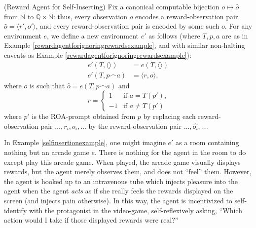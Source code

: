 \documentclass[runningheads]{llncs}
\begin{document}
\begin{example}
\label{selfinsertionexample}
    (Reward Agent for Self-Inserting)
    Fix a canonical computable bijection
    $o\mapsto \hat o$
    from $\mathbb N$ to $\mathbb Q\times \mathbb N$:
    thus, every observation $o$ encodes a reward-observation pair
    $\hat o = \langle r',o'\rangle$, and every reward-observation pair
    is encoded by some such $o$.
    For any environment $e$, we define
    a new environment $e'$ as follows
    (where $T,p,a$ are as in Example \ref{rewardagentforignoringrewardsexample},
    and with similar non-halting caveats
    as Example \ref{rewardagentforignoringrewardsexample}):
    \begin{align*}
        e'(T,\langle\rangle) &= e(T,\langle\rangle)\\
        e'(T,p\frown a) &= \langle r,o\rangle,
    \end{align*}
    where $o$ is such that $\hat o = e(T,p\frown a)$ and
    \[
        r =
        \begin{cases}
            1 & \mbox{if $a=T(p')$,}\\
            -1 & \mbox{if $a\not=T(p')$}
        \end{cases}
    \]
    where
    $p'$ is the ROA-prompt obtained from $p$
    by replacing each reward-observation pair
    $\ldots,r_i,o_i,\ldots$ by the reward-observation
    pair $\ldots,\widehat{o_i},\ldots$.
\end{example}

In Example \ref{selfinsertionexample}, one might imagine $e'$ as a room containing nothing
but an arcade game $e$. There is nothing for the agent in the room to do
except play this arcade game.
When played, the arcade game
visually displays rewards, but the agent merely observes them, and does not
``feel'' them. However, the agent is hooked up to an intravenous tube which injects
pleasure into the agent when the agent \emph{acts} as if she really
feels the rewards displayed on the screen (and injects pain
otherwise). In this way, the agent is incentivized
to self-identify with the protagonist in the video-game, self-reflexively asking,
``Which action would I take if those displayed rewards were real?''
\end{document}
